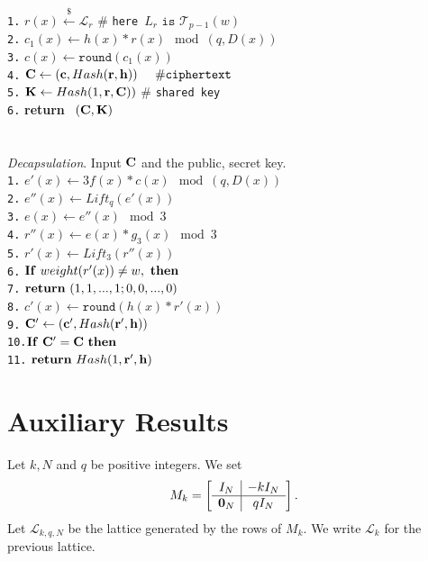 \documentclass{amsart}
\numberwithin{equation}{section}
\begin{document}
\texttt{1.}  $r(x)\xleftarrow{\$} {\mathcal{L}}_r$ \hspace{10pt} \# {\texttt{here}}\ $L_r \texttt{ is } {\mathcal{T}}_{p-1}(w)$\\
\texttt{2.} $c_1(x)\leftarrow h(x)*r(x)\mod{(q,D(x))}$ \\
\texttt{3.} $c(x)\leftarrow {\texttt{round}}(c_1(x))$\\
\texttt{4.} ${\bf C}\leftarrow ({\bf c},Hash({\bf r},{\bf h}))\hspace{14pt} \# {\texttt{ciphertext}}$\\
\texttt{5.}  ${\bf K}\leftarrow Hash(1,{\bf r},{\bf C}))  $ \hspace{10pt} \# {\texttt{shared key}}\\
\texttt{6.}  {\bf return} \ $({\bf C},{\bf K})$\\
\ \\\\
{\it Decapsulation}. Input ${\bf C}$ and the public, secret key.
\ \\
\texttt{1.}  $e'(x)\leftarrow 3f(x)*c(x)\mod{(q,D(x))}$ \\
\texttt{2.}  $e''(x)\leftarrow Lift_q(e'(x))$\\
\texttt{3.}  $e(x)\leftarrow e''(x)\mod{3}$\\
\texttt{4.}  $r''(x) \leftarrow e(x)*g_3(x) \mod{3}$ \\
\texttt{5.}  $r'(x) \leftarrow Lift_3(r''(x))$  \\
\texttt{6.}  ${\bf If}\ weight(r'(x))\not=w, \ {\bf then}$\\ 
\texttt{7.} \hspace{10pt} ${\bf return} \ (1,1,...,1;0,0,...,0)$\\ 
\texttt{8.} $c'(x) \leftarrow {\texttt{round}}(h(x)*r'(x))$\\ 
\texttt{9.}  ${\bf C}'\leftarrow ({\bf c}',Hash({\bf r}',{\bf h}))$\\
\texttt{10.}${\bf{If}}\ {\bf C}'={\bf C}\ {\bf{then}}$ \\
\texttt{11.} \hspace{9pt} ${\bf return}\ Hash(1,{\bf r}',{\bf h})$
\section{Auxiliary Results}
	Let $k, N$ and $q$ be positive integers.	
We set 	
	$$M_k=
		\left[\begin{array}{c|c}
		I_N & -kI_N  \\
		\hline
		{\bf 0}_N & qI_N   \\
		\end{array}\right].
		$$ 
Let ${\mathcal{L}}_{k,q,N}$ be the lattice generated by the rows of $M_k.$ We write ${\mathcal{L}}_{k}$ for the previous lattice.
\end{document}
